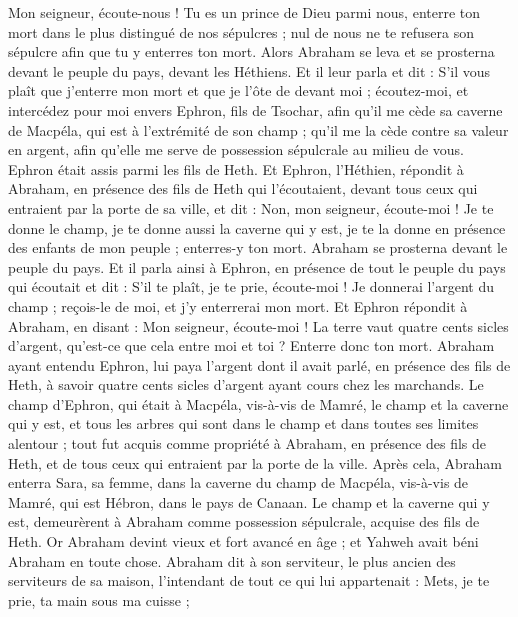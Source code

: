 \begin{multicols}{2}
Mon seigneur, écoute-nous ! Tu es un prince de Dieu parmi nous, enterre ton mort dans le plus distingué de nos sépulcres ; nul de nous ne te refusera son sépulcre afin que tu y enterres ton mort.
Alors Abraham se leva et se prosterna devant le peuple du pays, devant les Héthiens.
Et il leur parla et dit : S'il vous plaît que j'enterre mon mort et que je l'ôte de devant moi ; écoutez-moi, et intercédez pour moi envers Ephron, fils de Tsochar,
afin qu'il me cède sa caverne de Macpéla, qui est à l'extrémité de son champ ; qu'il me la cède contre sa valeur en argent, afin qu'elle me serve de possession sépulcrale au milieu de vous.
Ephron était assis parmi les fils de Heth. Et Ephron, l'Héthien, répondit à Abraham, en présence des fils de Heth qui l'écoutaient, devant tous ceux qui entraient par la porte de sa ville, et dit :
Non, mon seigneur, écoute-moi ! Je te donne le champ, je te donne aussi la caverne qui y est, je te la donne en présence des enfants de mon peuple ; enterres-y ton mort.
Abraham se prosterna devant le peuple du pays.
Et il parla ainsi à Ephron, en présence de tout le peuple du pays qui écoutait et dit : S'il te plaît, je te prie, écoute-moi ! Je donnerai l'argent du champ ; reçois-le de moi, et j'y enterrerai mon mort.
Et Ephron répondit à Abraham, en disant :
Mon seigneur, écoute-moi ! La terre vaut quatre cents sicles d'argent, qu'est-ce que cela entre moi et toi ? Enterre donc ton mort.
Abraham ayant entendu Ephron, lui paya l'argent dont il avait parlé, en présence des fils de Heth, à savoir quatre cents sicles d'argent ayant cours chez les marchands.
Le champ d'Ephron, qui était à Macpéla, vis-à-vis de Mamré, le champ et la caverne qui y est, et tous les arbres qui sont dans le champ et dans toutes ses limites alentour ;
tout fut acquis comme propriété à Abraham, en présence des fils de Heth, et de tous ceux qui entraient par la porte de la ville.
Après cela, Abraham enterra Sara, sa femme, dans la caverne du champ de Macpéla, vis-à-vis de Mamré, qui est Hébron, dans le pays de Canaan.
Le champ et la caverne qui y est, demeurèrent à Abraham comme possession sépulcrale, acquise des fils de Heth.
\VerseOne{}Or Abraham devint vieux et fort avancé en âge ; et Yahweh avait béni Abraham en toute chose.
Abraham dit à son serviteur, le plus ancien des serviteurs de sa maison, l'intendant de tout ce qui lui appartenait : Mets, je te prie, ta main sous ma cuisse ;

\end{multicols}
